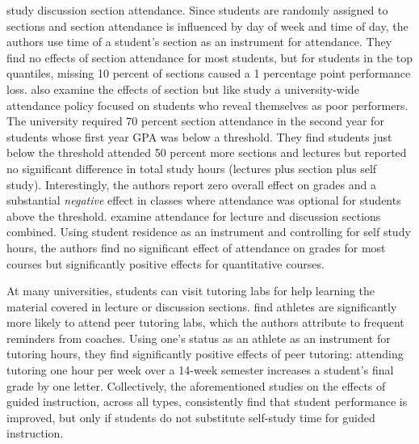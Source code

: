 \documentclass[12pt]{article}
\begin{document}
\textcite{ans2012} study discussion section attendance. Since students are randomly assigned to sections and section attendance is influenced by day of week and time of day, the authors use time of a student's section as an instrument for attendance. They find no effects of section attendance for most students, but for students in the top quantiles, missing 10 percent of sections caused a 1 percentage point performance loss. \textcite{kow2020} also examine the effects of section but like \textcite{dgm2010} study a university-wide attendance policy focused on students who reveal themselves as poor performers. The university required 70 percent section attendance in the second year for students whose first year GPA was below a threshold. They find students just below the threshold attended 50 percent more sections and lectures but reported no significant difference in total study hours (lectures plus section plus self study). Interestingly, the authors report zero overall effect on grades and a substantial \textit{negative} effect in classes where attendance was optional for students above the threshold. \textcite{bs2013} examine attendance for lecture and discussion sections combined. Using student residence as an instrument and controlling for self study hours, the authors find no significant effect of attendance on grades for most courses but significantly positive effects for quantitative courses.

At many universities, students can visit tutoring labs for help learning the material covered in lecture or discussion sections. \textcite{mgm2010} find athletes are significantly more likely to attend peer tutoring labs, which the authors attribute to frequent reminders from coaches. Using one's status as an athlete as an instrument for tutoring hours, they find significantly positive effects of peer tutoring: attending tutoring one hour per week over a 14-week semester increases a student's final grade by one letter. Collectively, the aforementioned studies on the effects of guided instruction, across all types, consistently find that student performance is improved, but only if students do not substitute self-study time for guided instruction.
\end{document}
